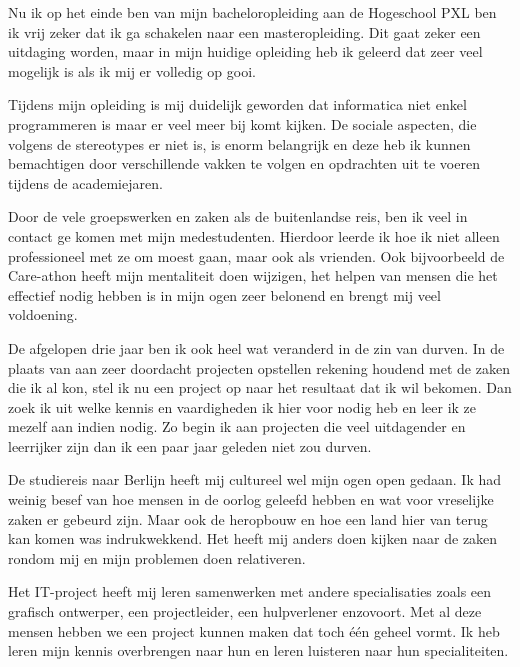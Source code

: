 
Nu ik op het einde ben van mijn bacheloropleiding aan de Hogeschool PXL ben ik vrij zeker dat ik ga schakelen naar een masteropleiding. Dit gaat zeker een uitdaging worden, maar in mijn huidige opleiding heb ik geleerd dat zeer veel mogelijk is als ik mij er volledig op gooi.

Tijdens mijn opleiding is mij duidelijk geworden dat informatica niet enkel programmeren is maar er veel meer bij komt kijken. De sociale aspecten, die volgens de stereotypes er niet is, is enorm belangrijk en deze heb ik kunnen bemachtigen door verschillende vakken te volgen en opdrachten uit te voeren tijdens de academiejaren.

Door de vele groepswerken en zaken als de buitenlandse reis, ben ik veel in contact ge komen met mijn medestudenten. Hierdoor leerde ik hoe ik niet alleen professioneel met ze om moest gaan, maar ook als vrienden. Ook bijvoorbeeld de Care\hyp{}athon heeft mijn mentaliteit doen wijzigen, het helpen van mensen die het effectief nodig hebben is in mijn ogen zeer belonend en brengt mij veel voldoening.

De afgelopen drie jaar ben ik ook heel wat veranderd in de zin van durven. In de plaats van aan zeer doordacht projecten opstellen rekening houdend met de zaken die ik al kon, stel ik nu een project op naar het resultaat dat ik wil bekomen. Dan zoek ik uit welke kennis en vaardigheden ik hier voor nodig heb en leer ik ze mezelf aan indien nodig. Zo begin ik aan projecten die veel uitdagender en leerrijker zijn dan ik een paar jaar geleden niet zou durven.

De studiereis naar Berlijn heeft mij cultureel wel mijn ogen open gedaan. Ik had weinig besef van hoe mensen in de oorlog geleefd hebben en wat voor vreselijke zaken er gebeurd zijn. Maar ook de heropbouw en hoe een land hier van terug kan komen was indrukwekkend. Het heeft mij anders doen kijken naar de zaken rondom mij en mijn problemen doen relativeren.

Het IT\hyp{}project heeft mij leren samenwerken met andere specialisaties zoals een grafisch ontwerper, een projectleider, een hulpverlener enzovoort. Met al deze mensen hebben we een project kunnen maken dat toch één geheel vormt. Ik heb leren mijn kennis overbrengen naar hun en leren luisteren naar hun specialiteiten.

